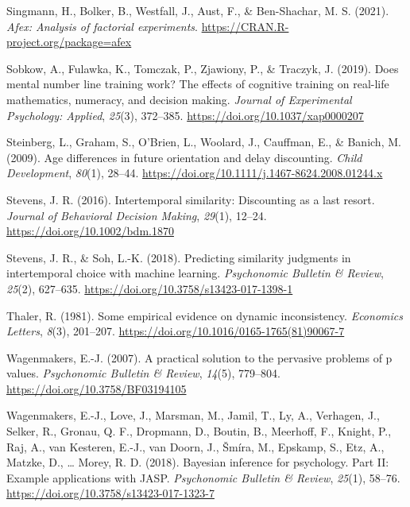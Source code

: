 \documentclass[
  pub,floatsintext]{apa6}
\newlength{\cslhangindent}
\newlength{\cslentryspacingunit} %
\newenvironment{CSLReferences}[2] %
 {%
  \setlength{\parindent}{0pt}
  \ifodd #1
  \let\oldpar\par
  \def\par{\hangindent=\cslhangindent\oldpar}
  \fi
  \setlength{\parskip}{#2\cslentryspacingunit}
 }%
 {}
\begin{document}
\begin{CSLReferences}{1}{0}
\leavevmode{}%
Singmann, H., Bolker, B., Westfall, J., Aust, F., \& Ben-Shachar, M. S. (2021). \emph{Afex: Analysis of factorial experiments}. \url{https://CRAN.R-project.org/package=afex}

\leavevmode{}%
Sobkow, A., Fulawka, K., Tomczak, P., Zjawiony, P., \& Traczyk, J. (2019). Does mental number line training work? {The} effects of cognitive training on real-life mathematics, numeracy, and decision making. \emph{Journal of Experimental Psychology: Applied}, \emph{25}(3), 372--385. \url{https://doi.org/10.1037/xap0000207}

\leavevmode{}%
Steinberg, L., Graham, S., O'Brien, L., Woolard, J., Cauffman, E., \& Banich, M. (2009). Age differences in future orientation and delay discounting. \emph{Child Development}, \emph{80}(1), 28--44. \url{https://doi.org/10.1111/j.1467-8624.2008.01244.x}

\leavevmode{}%
Stevens, J. R. (2016). Intertemporal similarity: {Discounting} as a last resort. \emph{Journal of Behavioral Decision Making}, \emph{29}(1), 12--24. \url{https://doi.org/10.1002/bdm.1870}

\leavevmode{}%
Stevens, J. R., \& Soh, L.-K. (2018). Predicting similarity judgments in intertemporal choice with machine learning. \emph{Psychonomic Bulletin \& Review}, \emph{25}(2), 627--635. \url{https://doi.org/10.3758/s13423-017-1398-1}

\leavevmode{}%
Thaler, R. (1981). Some empirical evidence on dynamic inconsistency. \emph{Economics Letters}, \emph{8}(3), 201--207. \url{https://doi.org/10.1016/0165-1765(81)90067-7}

\leavevmode{}%
Wagenmakers, E.-J. (2007). A practical solution to the pervasive problems of p values. \emph{Psychonomic Bulletin \& Review}, \emph{14}(5), 779--804. \url{https://doi.org/10.3758/BF03194105}

\leavevmode{}%
Wagenmakers, E.-J., Love, J., Marsman, M., Jamil, T., Ly, A., Verhagen, J., Selker, R., Gronau, Q. F., Dropmann, D., Boutin, B., Meerhoff, F., Knight, P., Raj, A., van Kesteren, E.-J., van Doorn, J., Šmíra, M., Epskamp, S., Etz, A., Matzke, D., \ldots{} Morey, R. D. (2018). Bayesian inference for psychology. {Part II}: {Example} applications with {JASP}. \emph{Psychonomic Bulletin \& Review}, \emph{25}(1), 58--76. \url{https://doi.org/10.3758/s13423-017-1323-7}


\end{CSLReferences}
\end{document}
